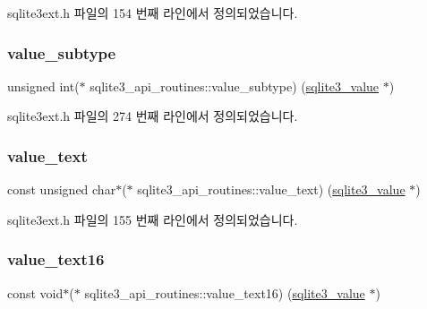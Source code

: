 sqlite3ext.\+h 파일의 154 번째 라인에서 정의되었습니다.

\mbox{\label{structsqlite3__api__routines_af0f929f8987bb8a039fa5cdc4f74dc4f}} 
\subsubsection{\texorpdfstring{value\+\_\+subtype}{value\_subtype}}
{\footnotesize\ttfamily unsigned int($\ast$ sqlite3\+\_\+api\+\_\+routines\+::value\+\_\+subtype) (\hyperlink{sqlite3_8h_ac2fa1ecdb2290d9af6010edbd1cbc83c}{sqlite3\+\_\+value} $\ast$)}



sqlite3ext.\+h 파일의 274 번째 라인에서 정의되었습니다.

\mbox{\label{structsqlite3__api__routines_ae83b9c4efba57334d83c50f59569a161}} 
\subsubsection{\texorpdfstring{value\+\_\+text}{value\_text}}
{\footnotesize\ttfamily const unsigned char$\ast$($\ast$ sqlite3\+\_\+api\+\_\+routines\+::value\+\_\+text) (\hyperlink{sqlite3_8h_ac2fa1ecdb2290d9af6010edbd1cbc83c}{sqlite3\+\_\+value} $\ast$)}



sqlite3ext.\+h 파일의 155 번째 라인에서 정의되었습니다.

\mbox{\label{structsqlite3__api__routines_ab58872245de9133b18ea75f2895bf0d9}} 
\subsubsection{\texorpdfstring{value\+\_\+text16}{value\_text16}}
{\footnotesize\ttfamily const void$\ast$($\ast$ sqlite3\+\_\+api\+\_\+routines\+::value\+\_\+text16) (\hyperlink{sqlite3_8h_ac2fa1ecdb2290d9af6010edbd1cbc83c}{sqlite3\+\_\+value} $\ast$)}



